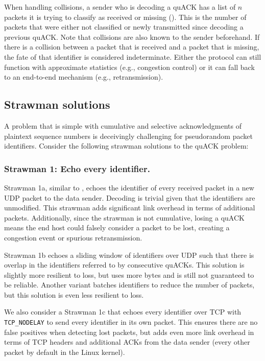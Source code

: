 

When handling collisions, a sender who is decoding a quACK has a list of $n$
packets it is trying to classify as received or missing
(). This is the number of packets that were either
not classified or newly transmitted since decoding a previous quACK.
Note that collisions are also known to the
sender beforehand. If there is a collision between a packet that is received
and a packet that is missing, the fate of that identifier is considered
indeterminate. Either the protocol can still function with approximate
statistics (e.g., congestion control) or it can fall back to an end-to-end
mechanism (e.g., retransmission).

\subsection{Strawman solutions}
\label{sec:quack:problem:strawmen}

A problem that is simple with cumulative and selective acknowledgments of
plaintext sequence numbers is deceivingly challenging for pseudorandom
packet identifiers. Consider the following strawman solutions to the quACK
problem:

\subsubsection{Strawman 1: Echo every identifier.}
Strawman 1a, similar to \cite{li-tsvwg-loops-problem-opportunities-06,kramer2020lwpep},
echoes the identifier of every received packet in a new UDP packet to the data
sender.  Decoding is trivial given that the identifiers are unmodified.
This strawman adds significant link overhead in terms of additional packets.
Additionally, since the strawman is not cumulative, losing a quACK means the
end host could falsely consider a packet to be lost, creating a congestion
event or spurious retransmission.

Strawman 1b echoes a sliding window of identifiers over UDP such that there is
overlap in the identifiers referred to by consecutive quACKs.
This solution is slightly more resilient to loss, but uses more bytes and is
still not guaranteed to be reliable.
Another variant batches identifiers to reduce the number of packets, but this
solution is even less resilient to loss.

We also consider a Strawman 1c that echoes every identifier over TCP with
\texttt{TCP\_NODELAY} to send every identifier in its own packet.
This ensures there are no false positives when detecting lost packets,
but adds even more link overhead in terms of TCP headers and additional ACKs
from the data sender (every other packet by default in the Linux kernel).

